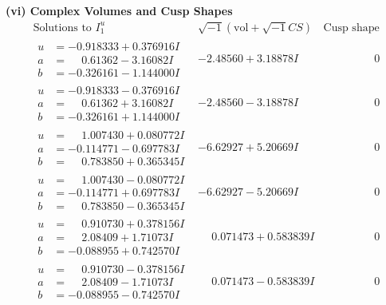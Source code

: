 \documentclass[1p]{elsarticle_modified}
\theoremstyle{definition}
\newcommand{\I}{\sqrt{-1}}
\begin{document}
\newpage\flushleft \textbf{(vi) Complex Volumes and Cusp Shapes}
$$\begin{array}{c|c|c}  
\text{Solutions to }I^u_{1}& \I (\text{vol} + \sqrt{-1}CS) & \text{Cusp shape}\\
 \hline 
\begin{aligned}
u &= -0.918333 + 0.376916 I \\
a &= \phantom{-}0.61362 - 3.16082 I \\
b &= -0.326161 - 1.144000 I\end{aligned}
 & -2.48560 + 3.18878 I & \phantom{-0.000000 } 0 \\ \hline\begin{aligned}
u &= -0.918333 - 0.376916 I \\
a &= \phantom{-}0.61362 + 3.16082 I \\
b &= -0.326161 + 1.144000 I\end{aligned}
 & -2.48560 - 3.18878 I & \phantom{-0.000000 } 0 \\ \hline\begin{aligned}
u &= \phantom{-}1.007430 + 0.080772 I \\
a &= -0.114771 - 0.697783 I \\
b &= \phantom{-}0.783850 + 0.365345 I\end{aligned}
 & -6.62927 + 5.20669 I & \phantom{-0.000000 } 0 \\ \hline\begin{aligned}
u &= \phantom{-}1.007430 - 0.080772 I \\
a &= -0.114771 + 0.697783 I \\
b &= \phantom{-}0.783850 - 0.365345 I\end{aligned}
 & -6.62927 - 5.20669 I & \phantom{-0.000000 } 0 \\ \hline\begin{aligned}
u &= \phantom{-}0.910730 + 0.378156 I \\
a &= \phantom{-}2.08409 + 1.71073 I \\
b &= -0.088955 + 0.742570 I\end{aligned}
 & \phantom{-}0.071473 + 0.583839 I & \phantom{-0.000000 } 0 \\ \hline\begin{aligned}
u &= \phantom{-}0.910730 - 0.378156 I \\
a &= \phantom{-}2.08409 - 1.71073 I \\
b &= -0.088955 - 0.742570 I\end{aligned}
 & \phantom{-}0.071473 - 0.583839 I & \phantom{-0.000000 } 0 \\ \hline\begin{aligned}

\end{aligned}
\end{array}$$
\end{document}
